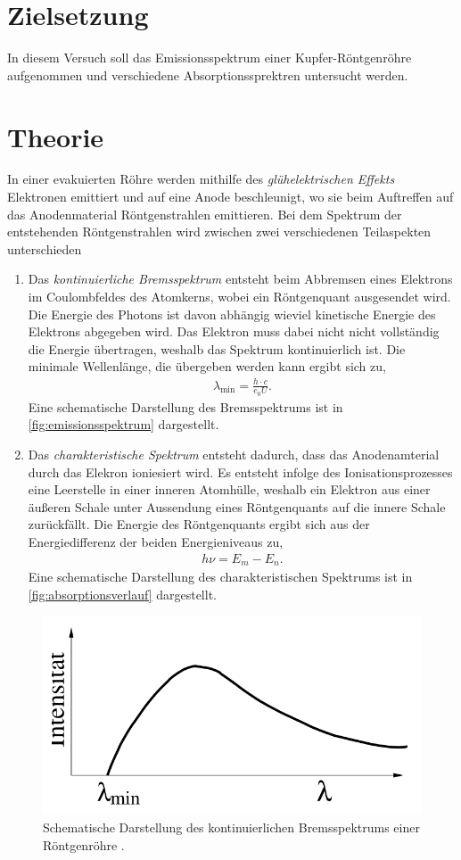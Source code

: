\section{Zielsetzung}
\label{sec:ziel}
In diesem Versuch soll das Emissionsspektrum einer Kupfer-Röntgenröhre aufgenommen und verschiedene Absorptionssprektren untersucht werden.

\section{Theorie}
\label{sec:Theorie}
In einer evakuierten Röhre werden mithilfe des \textit{glühelektrischen Effekts} Elektronen emittiert und auf eine Anode beschleunigt, wo sie beim Auftreffen
auf das Anodenmaterial Röntgenstrahlen emittieren. Bei dem Spektrum der entstehenden Röntgenstrahlen wird zwischen zwei verschiedenen Teilaspekten unterschieden
\begin{enumerate}
    \item Das \textit{kontinuierliche Bremsspektrum} entsteht beim Abbremsen eines Elektrons im Coulombfeldes des Atomkerns, wobei ein Röntgenquant ausgesendet wird. Die Energie des Photons
    ist davon abhängig wieviel kinetische Energie des Elektrons abgegeben wird. Das Elektron muss dabei nicht nicht vollständig die Energie übertragen, weshalb das Spektrum kontinuierlich ist.
    Die minimale Wellenlänge, die übergeben werden kann ergibt sich zu,
    \begin{align}
        \label{eqn:wellenlaenge}
        \lambda_{\text{min}} = \frac{h\cdot c}{e_0 U}.
    \end{align}
    Eine schematische Darstellung des Bremsspektrums ist in \autoref{fig:emissionsspektrum} dargestellt.
    \item Das \textit{charakteristische Spektrum} entsteht dadurch, dass das Anodenamterial durch das Elekron ioniesiert wird. Es entsteht infolge des Ionisationsprozesses eine Leerstelle in einer inneren
    Atomhülle, weshalb ein Elektron aus einer äußeren Schale unter Aussendung eines Röntgenquants auf die innere Schale zurückfällt. Die Energie des Röntgenquants ergibt sich aus der Energiedifferenz
    der beiden Energieniveaus zu,
    \begin{align}
        \label{eqn:energiedifferenz}
        h \nu = E_m - E_n.
    \end{align}
    Eine schematische Darstellung des charakteristischen Spektrums ist in \autoref{fig:absorptionsverlauf} dargestellt.
\end{enumerate}
\begin{figure}[H]
    \centering
    \includegraphics[width = 0.5 \textwidth]{data/emissionsspektrum.png}
    \caption{Schematische Darstellung des kontinuierlichen Bremsspektrums einer Röntgenröhre \cite{Anleitung602}.}
    \label{fig:emissionsspektrum}
\end{figure}

